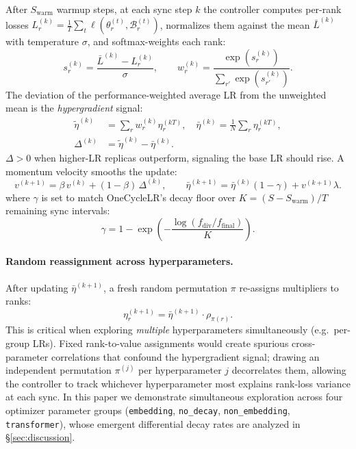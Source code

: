 \documentclass{article}
\begin{document}
After $S_{\mathrm{warm}}$ warmup steps, at each sync step $k$ the controller
computes per-rank losses $L_r^{(k)} = \frac{1}{T}\sum_t \ell(\theta_r^{(t)},
\mathcal{B}_r^{(t)})$, normalizes them against the mean $\bar{L}^{(k)}$ with
temperature $\sigma$, and softmax-weights each rank:
\begin{equation}
  s_r^{(k)} = \frac{\bar{L}^{(k)} - L_r^{(k)}}{\sigma}, \qquad
  w_r^{(k)} = \frac{\exp(s_r^{(k)})}{\sum_{r'}\exp(s_{r'}^{(k)})}.
  \label{eq:score}
\end{equation}
The deviation of the performance-weighted average LR from the unweighted mean is
the \emph{hypergradient} signal:
\begin{align}
  \tilde\eta^{(k)} &= \textstyle\sum_r w_r^{(k)}\eta_r^{(kT)}, \quad
  \bar\eta^{(k)} = \tfrac{1}{N}\textstyle\sum_r \eta_r^{(kT)}, \label{eq:wavg}\\
  \Delta^{(k)} &= \tilde\eta^{(k)} - \bar\eta^{(k)}. \label{eq:delta}
\end{align}
$\Delta > 0$ when higher-LR replicas outperform, signaling the base LR should rise.
A momentum velocity smooths the update:
\begin{equation}
  v^{(k+1)} = \beta\, v^{(k)} + (1-\beta)\,\Delta^{(k)}, \qquad
  \bar\eta^{(k+1)} = \bar\eta^{(k)}(1-\gamma) + v^{(k+1)}\lambda.
  \label{eq:velocity}
\end{equation}
where $\gamma$ is set to match OneCycleLR's decay floor over $K{=}(S{-}S_{\mathrm{warm}})/T$
remaining sync intervals:
\begin{equation}
  \gamma = 1 - \exp\!\left(-\frac{\log(f_{\mathrm{div}}/f_{\mathrm{final}})}{K}\right).
  \label{eq:decay}
\end{equation}

\paragraph{Random reassignment across hyperparameters.}
After updating $\bar\eta^{(k+1)}$, a fresh random permutation $\pi$ re-assigns
multipliers to ranks:
\begin{equation}
  \eta_r^{(k+1)} = \bar\eta^{(k+1)} \cdot \rho_{\pi(r)}.
  \label{eq:reassign}
\end{equation}
This is critical when exploring \emph{multiple} hyperparameters simultaneously
(e.g.\ per-group LRs).  Fixed rank-to-value assignments would create spurious
cross-parameter correlations that confound the hypergradient signal; drawing an
independent permutation $\pi^{(j)}$ per hyperparameter $j$ decorrelates them,
allowing the controller to track whichever hyperparameter most explains rank-loss
variance at each sync.  In this paper we demonstrate simultaneous exploration across
four optimizer parameter groups (\texttt{embedding}, \texttt{no\_decay},
\texttt{non\_embedding}, \texttt{transformer}), whose emergent differential
decay rates are analyzed in \S\ref{sec:discussion}.
\end{document}
